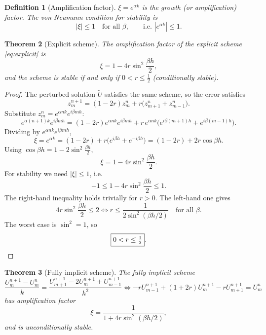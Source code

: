 \documentclass[11pt,a4paper]{article}
\numberwithin{equation}{section}
\theoremstyle{spacedplain}
\newtheorem{theorem}{Theorem}[section]
\theoremstyle{spaceddefinition}
\newtheorem{definition}[theorem]{Definition}
\theoremstyle{spacedremark}
\begin{document}
\begin{definition}[Amplification factor]
\(\xi=e^{\alpha k}\) is the \emph{growth} (or \emph{amplification})
factor.  The von Neumann condition for stability is
\[
  |\xi|\le1\quad\text{for all }\beta,
  \qquad\text{i.e. } |e^{\alpha k}|\le1.
\]
\end{definition}

\begin{keybox}
\begin{theorem}[Explicit scheme]\label{thm:vn1}
The amplification factor of the explicit scheme \eqref{eq:explicit} is
\[
  \xi=1-4r\sin^2\frac{\beta h}2,
\]
and the scheme is stable if and only if \(0<r\le\frac12\)
(conditionally stable).
\end{theorem}
\end{keybox}

\begin{proof}
The perturbed solution \(\widetilde U\) satisfies the same scheme, so
the error satisfies
\[
  z_m^{n+1}=(1-2r)z_m^n+r\bigl(z_{m+1}^n+z_{m-1}^n\bigr).
\]
Substitute \(z_m^n=e^{\alpha nk}e^{i\beta mh}\):
\[
  e^{\alpha(n+1)k}e^{i\beta mh}
  =(1-2r)e^{\alpha nk}e^{i\beta mh}
   +r\,e^{\alpha nk}\bigl(e^{i\beta(m+1)h}+e^{i\beta(m-1)h}\bigr).
\]
Dividing by \(e^{\alpha nk}e^{i\beta mh}\),
\[
  \xi=e^{\alpha k}
  =(1-2r)+r\bigl(e^{i\beta h}+e^{-i\beta h}\bigr)
  =(1-2r)+2r\cos\beta h.
\]
Using \(\cos\beta h=1-2\sin^2\frac{\beta h}{2}\),
\[
  \boxed{\xi=1-4r\sin^2\frac{\beta h}2}.
\]
For stability we need \(|\xi|\le1\), i.e.
\[
  -1\le1-4r\sin^2\frac{\beta h}2\le1.
\]
The right-hand inequality holds trivially for \(r>0\).  The left-hand
one gives
\[
  4r\sin^2\frac{\beta h}2\le2
  \iff
  r\le\frac1{2\sin^2(\beta h/2)}\quad\text{for all }\beta.
\]
The worst case is \(\sin^2=1\), so
\[
  \boxed{0<r\le\tfrac12}. \qedhere
\]
\end{proof}

\begin{keybox}
\begin{theorem}[Fully implicit scheme]\label{thm:vn2}
The fully implicit scheme
\begin{equation}\label{eq:impl}
  \frac{U_m^{n+1}-U_m^n}{k}
  =\frac{U_{m+1}^{n+1}-2U_m^{n+1}+U_{m-1}^{n+1}}{h^2}
  \iff
  -rU_{m-1}^{n+1}+(1+2r)U_m^{n+1}-rU_{m+1}^{n+1}=U_m^n
\end{equation}
has amplification factor
\[
  \xi=\frac{1}{1+4r\sin^2(\beta h/2)},
\]
and is unconditionally stable.
\end{theorem}
\end{keybox}
\end{document}
